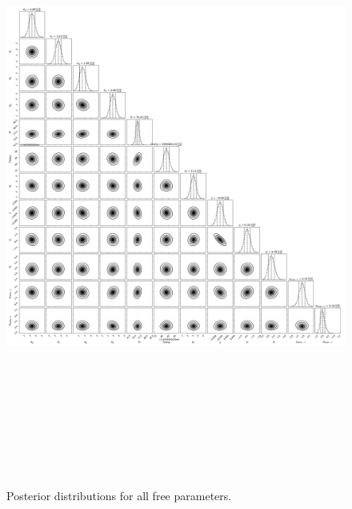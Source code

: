 \documentclass{emulateapj}
\begin{document}
 
\begin{figure}[!h]
\centering

\includegraphics[height=8.0in,width=6.0in,keepaspectratio]{rdvel+harps_corner.pdf}
\caption{Posterior distributions for all free parameters.}
\end{figure} 

 

\end{document}

